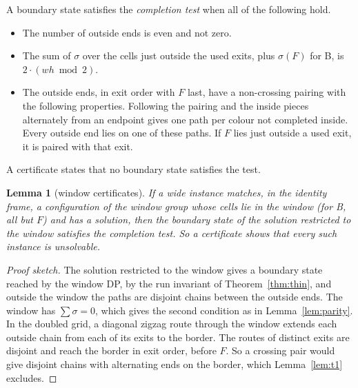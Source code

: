 \documentclass[11pt]{article}
\newtheorem{lemma}[theorem]{Lemma}
\newcommand{\ent}[1]{\textsf{#1}}
\begin{document}
A boundary state satisfies the \emph{completion test} when all of the following hold.
\begin{itemize}
\item The number of outside ends is even and not zero.
\item The sum of $\sigma$ over the cells just outside the used exits, plus $\sigma(F)$ for
  \ent{B}, is $2\cdot(wh\bmod 2)$.
\item The outside ends, in exit order with $F$ last, have a non-crossing pairing with the
  following properties. Following the pairing and the inside pieces alternately from an endpoint
  gives one path per colour not completed inside. Every outside end lies on one of these paths.
  If $F$ lies just outside a used exit, it is paired with that exit.
\end{itemize}
A certificate states that no boundary state satisfies the test.

\begin{lemma}[window certificates]\label{lem:window}
If a wide instance matches, in the identity frame, a configuration of the window group whose cells
lie in the window (for \ent{B}, all but $F$) and has a solution, then the boundary state of the
solution restricted to the window satisfies the completion test. So a certificate shows that every
such instance is unsolvable.
\end{lemma}
\begin{proof}[Proof sketch]
The solution restricted to the window gives a boundary state reached by the window DP, by the
run invariant of Theorem~\ref{thm:thin}, and outside the window the paths are disjoint chains between
the outside ends. The window has $\sum\sigma=0$, which gives the second condition as in
Lemma~\ref{lem:parity}. In the doubled grid, a diagonal zigzag route through the window extends
each outside chain from each of its exits to the border. The routes of distinct exits are
disjoint and reach the border in exit order, before $F$. So a crossing pair would give disjoint
chains with alternating ends on the border, which Lemma~\ref{lem:t1} excludes.
\end{proof}
\end{document}
